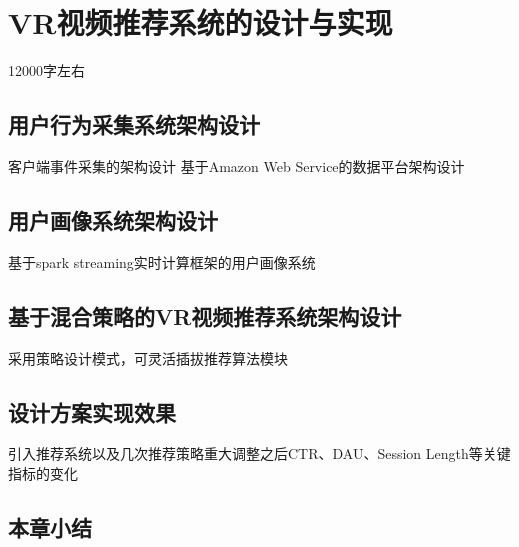 \chapter{VR视频推荐系统的设计与实现}
12000字左右

\section{用户行为采集系统架构设计}
客户端事件采集的架构设计
基于Amazon Web Service的数据平台架构设计

\section{用户画像系统架构设计}
基于spark streaming实时计算框架的用户画像系统

\section{基于混合策略的VR视频推荐系统架构设计}
采用策略设计模式，可灵活插拔推荐算法模块

\section{设计方案实现效果}
引入推荐系统以及几次推荐策略重大调整之后CTR、DAU、Session Length等关键指标的变化

\section{本章小结}